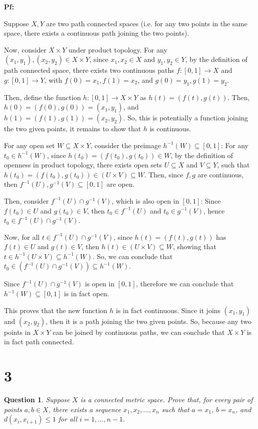 \documentclass{article}
\newtheorem{question}{Question}
\begin{document}
\textbf{Pf:}

Suppose $X,Y$ are two path connected spaces (i.e. for any two points in the same space, there exists a continuous path joining the two points).

\hfil

Now, consider $X\times Y$ under product topology. For any $(x_1,y_1),(x_2,y_2)\in X\times Y$, since $x_1,x_2\in X$ and $y_1,y_2\in Y$,
by the definition of path connected space, there exists two continuous paths $f:[0,1]\rightarrow X$ and $g:[0,1]\rightarrow Y$, with $f(0)=x_1,f(1)=x_2$, and $g(0)=y_1,g(1)=y_2$.

Then, define the function $h:[0,1]\rightarrow X\times Y$ as $h(t)=(f(t),g(t))$. Then, $h(0)=(f(0),g(0))=(x_1,y_1)$, and $h(1)=(f(1),g(1))=(x_2,y_2)$.
So, this is potentially a function joining the two given points, it remains to show that $h$ is continuous.

\hfil

For any open set $W\subseteq X\times Y$, consider the preimage $h^{-1}(W)\subseteq [0,1]$: For any $t_0\in h^{-1}(W)$, since $h(t_0) = (f(t_0),g(t_0))\in W$, by the definition of openness in product topology,
there exists open sets $U\subseteq X$ and $V\subseteq Y$, such that $h(t_0)=(f(t_0),g(t_0))\in (U\times V)\subseteq W$. Then, since $f,g$ are continuous, then $f^{-1}(U), g^{-1}(V)\subseteq [0,1]$ are open.

Then, consider $f^{-1}(U)\cap g^{-1}(V)$, which is also open in $[0,1]$: Since $f(t_0)\in U$ and $g(t_0)\in V$, then $t_0\in f^{-1}(U)$ and $t_0\in g^{-1}(V)$,
hence $t_0\in f^{-1}(U) \cap g^{-1}(V)$.

Now, for all $t\in f^{-1}(U)\cap g^{-1}(V)$, since $h(t)=(f(t),g(t))$ has $f(t)\in U$ and $g(t)\in V$,
then $h(t)\in (U\times V) \subseteq W$, showing that $t\in h^{-1}(U\times V) \subseteq h^{-1}(W)$.
So, we can conclude that $t_0\in (f^{-1}(U)\cap g^{-1}(V))\subseteq h^{-1}(W)$.

Since $f^{-1}(U)\cap g^{-1}(V)$ is open in $[0,1]$, therefore we can conclude that $h^{-1}(W)\subseteq [0,1]$ is in fact open.

This proves that the new function $h$ is in fact continuous. Since it joins $(x_1,y_1)$ and $(x_2,y_2)$, then it is a path joining the two given points.
So, because any two points in $X\times Y$ can be joined by continuous paths, we can conclude that $X\times Y$ is in fact path connected.

\break

\section*{3}
\begin{myBox}[]{}
    \begin{question}
        Suppose $X$ is a connected metric space. Prove that, for every pair of points $a,b\in X$,
        there exists a sequence $x_1,x_2,...,x_n$ such that $a=x_1$, $b=x_n$, and $d(x_i,x_{i+1})\leq 1$
        for all $i=1,...,n-1$.
    \end{question}
\end{myBox}
\end{document}
